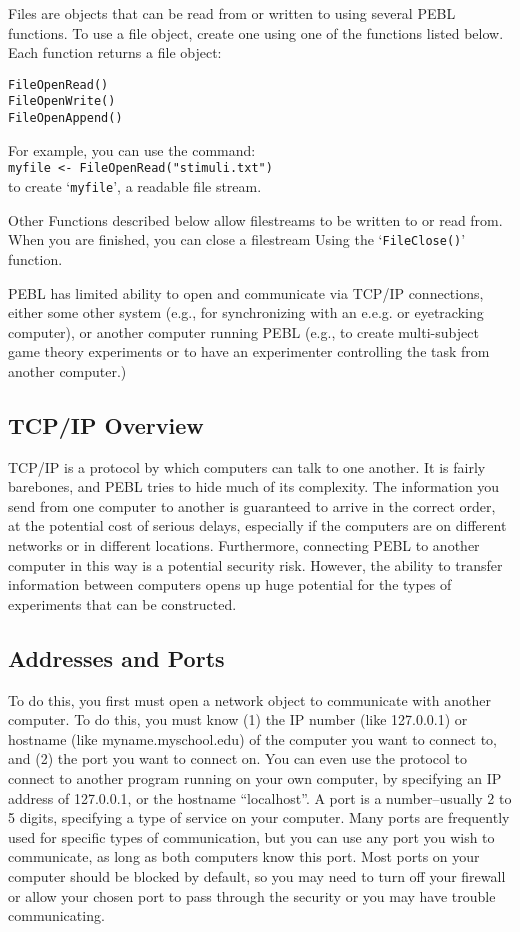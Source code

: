 
Files are objects that can be read from or written to using several PEBL functions. To use a file object, create one using one of the functions 
listed below.  Each function returns a file object:
\begin{verbatim}
FileOpenRead()
FileOpenWrite()
FileOpenAppend()
\end{verbatim}

For example, you can use the command:\\
 \texttt{myfile <-  FileOpenRead("stimuli.txt")} \\
to create `\texttt{myfile}', a readable
file stream.


Other Functions described below allow filestreams to be written to 
or read from.  When you are finished, you can close a filestream 
Using the `\texttt{FileClose()}' function.



PEBL has limited ability to open and communicate via  TCP/IP
connections, either some other system (e.g., for synchronizing with an
e.e.g. or eyetracking computer), or another computer running PEBL
(e.g., to create multi-subject game theory experiments or to have an
experimenter controlling the task from another computer.)

\subsection{TCP/IP Overview}
TCP/IP is a protocol by which computers can talk to one another.  It
is fairly barebones, and PEBL tries to hide much of its
complexity. The information you send from one computer to another is
guaranteed to arrive in the correct order, at the potential cost of
serious delays, especially if the computers are on different networks
or in different locations.  Furthermore, connecting PEBL to another
computer in this way is a potential security risk. However, the
ability to transfer information between computers opens up huge
potential for the types of experiments that can be constructed.

\subsection{Addresses and Ports}
To do this, you first must open a network object to communicate with
another computer.  To do this, you must know (1) the IP number (like
127.0.0.1) or hostname (like myname.myschool.edu) of the computer you
want to connect to, and (2) the port you want to connect on. You can even
use the protocol to connect to another program running on your own
computer, by specifying an IP address of 127.0.0.1, or the hostname
``localhost''.  A port is
a number--usually 2 to 5 digits, specifying a type of service
on your computer. Many ports are frequently used for specific types of
communication, but you can use any port you wish to communicate, as
long as both computers know this port. Most ports on your computer
should be blocked by default, so you may need to turn off your
firewall or allow your chosen port to pass through the security or you
may have trouble communicating.

